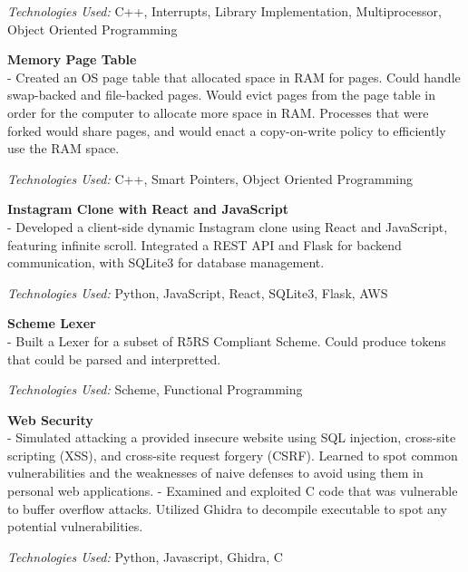 \documentclass[9pt]{extarticle}
\begin{document}
\textit{Technologies Used:} C++, Interrupts, Library Implementation, Multiprocessor, Object Oriented Programming


\noindent \textbf{Memory Page Table}\\
- Created an OS page table that allocated space in RAM for pages. Could handle swap-backed and file-backed pages.
Would evict pages from the page table in order for the computer to allocate more space in RAM.
Processes that were forked would share pages, and would enact a copy-on-write policy to efficiently use the RAM space.

\textit{Technologies Used:} C++, Smart Pointers, Object Oriented Programming

\noindent \textbf{Instagram Clone with React and JavaScript} \\
- Developed a client-side dynamic Instagram clone using React and JavaScript,
featuring infinite scroll. Integrated a REST API and Flask for backend communication,
with SQLite3 for database management.

\textit{Technologies Used:} Python, JavaScript, React, SQLite3, Flask, AWS

\noindent \textbf{Scheme Lexer} \\
- Built a Lexer for a subset of R5RS Compliant Scheme. Could produce tokens that could be parsed and interpretted.

\textit{Technologies Used:} Scheme, Functional Programming

\noindent \textbf{Web Security} \\
- Simulated attacking a provided insecure website using SQL
injection, cross-site scripting (XSS), and cross-site request forgery
(CSRF). Learned to spot common vulnerabilities and the
weaknesses of naive defenses to avoid using them in personal web
applications.
- Examined and exploited C code that was vulnerable to buffer overflow attacks. Utilized Ghidra to
decompile executable to spot any potential vulnerabilities.

\textit{Technologies Used:} Python, Javascript, Ghidra, C
\end{document}
